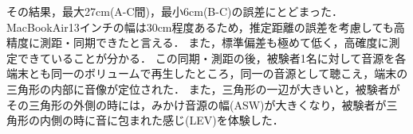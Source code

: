 その結果，最大27cm(A-C間)，最小6cm(B-C)の誤差にとどまった．
MacBookAir13インチの幅は30cm程度あるため，推定距離の誤差を考慮しても高精度に測距・同期できたと言える．
また，標準偏差も極めて低く，高確度に測定できていることが分かる．
この同期・測距の後，被験者1名に対して音源を各端末とも同一のボリュームで再生したところ，同一の音源として聴こえ，端末の三角形の内部に音像が定位された．
また，三角形の一辺が大きいと，被験者がその三角形の外側の時には，みかけ音源の幅(ASW)が大きくなり，被験者が三角形の内側の時に音に包まれた感じ(LEV)を体験した．

